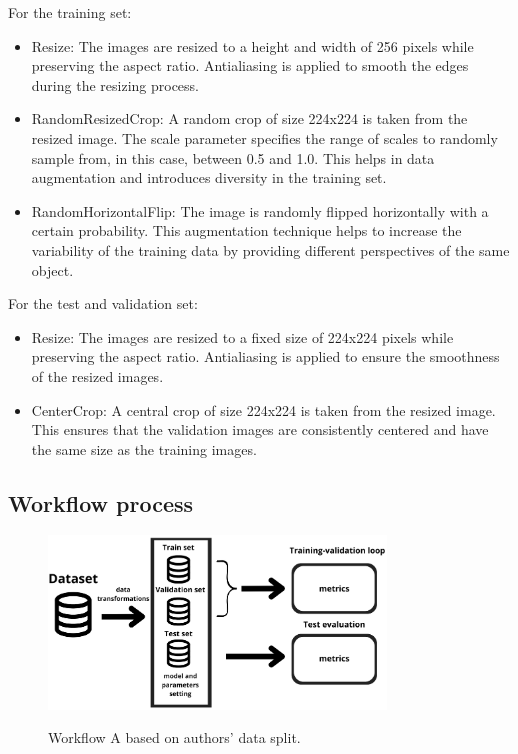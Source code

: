 \documentclass[runningheads]{llncs}
\begin{document}
For the training set:
\begin{itemize}
  \item Resize: The images are resized to a height and width of 256 pixels while preserving the aspect ratio. Antialiasing is applied to smooth the edges during the resizing process.
  \item RandomResizedCrop: A random crop of size 224x224 is taken from the resized image. The scale parameter specifies the range of scales to randomly sample from, in this case, between 0.5 and 1.0. This helps in data augmentation and introduces diversity in the training set.
  \item RandomHorizontalFlip: The image is randomly flipped horizontally with a certain probability. This augmentation technique helps to increase the variability of the training data by providing different perspectives of the same object.
\end{itemize}

For the test and validation set:
\begin{itemize}
  \item Resize: The images are resized to a fixed size of 224x224 pixels while preserving the aspect ratio. Antialiasing is applied to ensure the smoothness of the resized images.
  \item CenterCrop: A central crop of size 224x224 is taken from the resized image. This ensures that the validation images are consistently centered and have the same size as the training images.
\end{itemize}

\subsection{Workflow process}

\begin{figure}[H]
\centering
{
\includegraphics[width=0.80\textwidth]{LaTeX_script/Schema/workflow2.png}
}
\label{SimpleCNNs}
\caption{Workflow A based on authors' data split.}
\end{figure}
\end{document}
